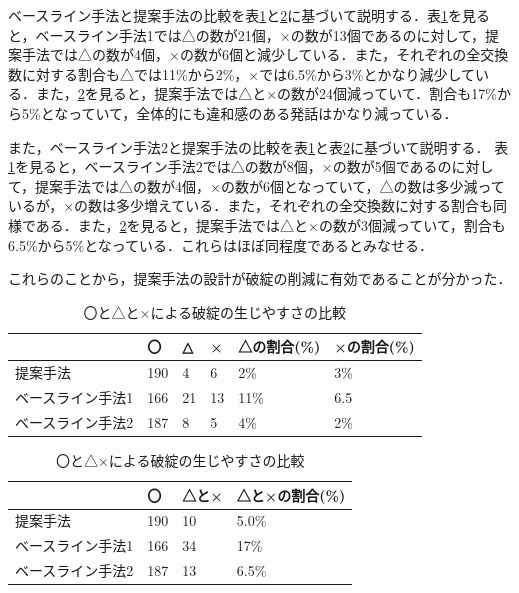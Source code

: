 \documentclass[12pt,a4paper,twoside,openany]{jbook}
\begin{document}
ベースライン手法と提案手法の比較を表\ref{hatanhindohyo1}と\ref{hatanhindohyo2}に基づいて説明する．表\ref{hatanhindohyo1}を見ると，ベースライン手法1では△の数が21個，×の数が13個であるのに対して，提案手法では△の数が4個，×の数が6個と減少している．また，それぞれの全交換数に対する割合も△では11\%から2\%，×では6.5\%から3\%とかなり減少している．また，\ref{hatanhindohyo2}を見ると，提案手法では△と×の数が24個減っていて．割合も17\%から5\%となっていて，全体的にも違和感のある発話はかなり減っている．

また，ベースライン手法2と提案手法の比較を表\ref{hatanhindohyo1}と表\ref{hatanhindohyo2}に基づいて説明する．
表\ref{hatanhindohyo1}を見ると，ベースライン手法2では△の数が8個，×の数が5個であるのに対して，提案手法では△の数が4個，×の数が6個となっていて，△の数は多少減っているが，×の数は多少増えている．また，それぞれの全交換数に対する割合も同様である．また，\ref{hatanhindohyo2}を見ると，提案手法では△と×の数が3個減っていて，割合も6.5\%から5\%となっている．これらはほぼ同程度であるとみなせる．

これらのことから，提案手法の設計が破綻の削減に有効であることが分かった．



\begin{table}[tb]
\caption{〇と△と×による破綻の生じやすさの比較}\centering\label{hatanhindohyo1}
  \begin{tabular}{|l|l|l|l|l|l|} \hline
     & 〇& △& ×& △の割合(\%) &×の割合(\%) \\ \hline \hline
    提案手法 & 190 & 4 & 6 &2\% &3\%  \\ \hline
    ベースライン手法1 & 166 & 21 & 13 & 11\% & 6.5 \\ \hline
    ベースライン手法2 &  187&  8& 5& 4\% &2\% \\ \hline
  \end{tabular}
\end{table}
\begin{table}[tb]
\caption{〇と△×による破綻の生じやすさの比較}\centering\label{hatanhindohyo2}
  \begin{tabular}{|l|l|l|l|} \hline
     & 〇& △と×&△と×の割合(\%)\\ \hline \hline
    提案手法 & 190 & 10 &5.0\% \\ \hline
    ベースライン手法1 & 166 & 34 &  17\% \\ \hline
    ベースライン手法2 &  187&  13 & 6.5\% \\ \hline
  \end{tabular}
\end{table}
\end{document}
